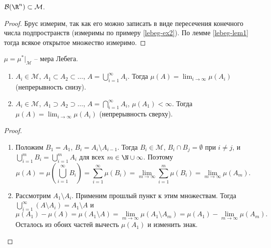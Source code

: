 \begin{corollary}
    $\mathcal{B}(\R^{n}) \subset \mathcal{M}$.
\end{corollary}

\begin{proof}
    Брус измерим, так как его можно записать в виде пересечения конечного числа подпространств (измеримы по примеру \ref{lebeg-ex2}). По лемме \ref{lebeg-lem1} тогда всякое открытое множество измеримо.
\end{proof}

\begin{definition}
    $\mu = \mu^{*}\lvert_{\mathcal{M}}$ -- мера Лебега.
\end{definition}

\begin{theorem}
    \begin{enumerate}
        \item $A_{i} \in \mathcal{M}$, $A_{1} \subset A_{2} \subset \ldots$, $A = \bigcup_{i = 1}^{\infty} A_{i}$. Тогда $\mu(A) = \lim_{i \to \infty}\mu(A_{i})$ (непрерывность снизу).
        \item $A_{i} \in \mathcal{M}$, $A_{1} \supset A_{2} \supset \ldots$, $A = \bigcap_{i = 1}^{\infty}A_{i}$, $\mu(A_{1}) < \infty$. Тогда $\mu(A) = \lim_{i \to \infty}\mu(A_{i})$ (непрерывность сверху).
    \end{enumerate}
\end{theorem}

\begin{proof}
    \begin{enumerate}
        \item Положим $B_{1} = A_{1}$, $B_{i} = A_{i} \setminus A_{i - 1}$. Тогда $B_{i} \in \mathcal{M}$, $B_{i} \cap B_{j} = \emptyset$ при $i \neq j$, и $\bigcup_{i = 1}^{m}B_{i} = \bigcup_{i = 1}^{m}A_{i}$ для всех $m \in \N \cup \infty$. Поэтому
        \[\mu(A) = \mu\left(\bigcup_{i = 1}^{\infty}B_{i}\right) = \sum_{i = 1}^{\infty}\mu(B_{i}) = \lim_{m \to \infty}\sum_{i = 1}^{m} \mu(B_{i}) = \lim_{m \to \infty}\mu(A_{m}).\]
        \item Рассмотрим $A_{1} \setminus A_{i}$. Применим прошлый пункт к этим множествам. Тогда $\bigcup_{i = 1}^{\infty}(A \setminus A_{i}) = A_{1} \setminus A$ и 
        \[\mu(A_{1}) - \mu(A) = \mu(A_{1} \setminus A) = \lim_{m \to \infty}\mu(A_{1} \setminus A_{m}) = \mu(A_{1}) - \lim_{m \to \infty}\mu(A_{m}).\]
        Осталось из обоих частей вычесть $\mu(A_{1})$ и изменить знак.
    \end{enumerate}
\end{proof}

